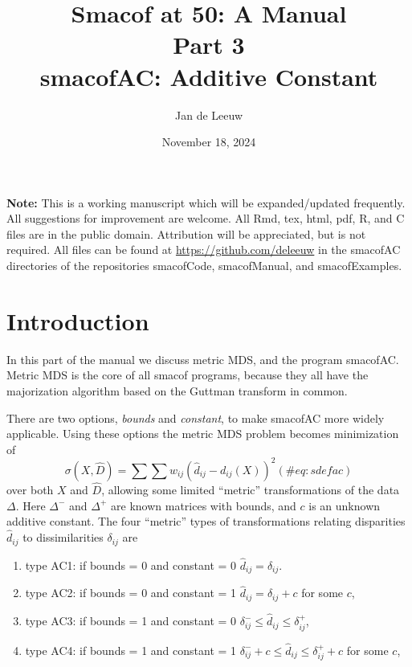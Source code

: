 \documentclass[
  12pt,
  letterpaper,
  DIV=11,
  numbers=noendperiod]{scrartcl}
\title{Smacof at 50: A Manual\\
Part 3\\
smacofAC: Additive Constant}
\author{Jan de Leeuw}
\date{November 18, 2024}
\providecommand{\tightlist}{%
  \setlength{\itemsep}{0pt}\setlength{\parskip}{0pt}}\usepackage{longtable,booktabs,array}
\renewcommand*\contentsname{Table of contents}
\newcommand\contentsname{Table of contents}
\begin{document}
\maketitle

\renewcommand*\contentsname{Table of contents}
{
\hypersetup{linkcolor=}
\setcounter{tocdepth}{3}
\tableofcontents
}

\textbf{Note:} This is a working manuscript which will be
expanded/updated frequently. All suggestions for improvement are
welcome. All Rmd, tex, html, pdf, R, and C files are in the public
domain. Attribution will be appreciated, but is not required. All files
can be found at \url{https://github.com/deleeuw} in the smacofAC
directories of the repositories smacofCode, smacofManual, and
smacofExamples.

\section{Introduction}\label{introduction}

In this part of the manual we discuss metric MDS, and the program
smacofAC. Metric MDS is the core of all smacof programs, because they
all have the majorization algorithm based on the Guttman transform in
common.

There are two options, \emph{bounds} and \emph{constant}, to make
smacofAC more widely applicable. Using these options the metric MDS
problem becomes minimization of \begin{equation}
\sigma(X,\hat D)=\sum\sum w_{ij}(\hat d_{ij}-d_{ij}(X))^2
(\#eq:sdefac)
\end{equation} over both \(X\) and \(\hat D\), allowing some limited
``metric'' transformations of the data \(\Delta\). Here \(\Delta^-\) and
\(\Delta^+\) are known matrices with bounds, and \(c\) is an unknown
additive constant. The four ``metric'' types of transformations relating
disparities \(\hat d_{ij}\) to dissimilarities \(\delta_{ij}\) are

\begin{enumerate}
\def\labelenumi{\arabic{enumi}.}
\tightlist
\item
  type AC1: if bounds = 0 and constant = 0 \(\hat d_{ij}=\delta_{ij}\).
\item
  type AC2: if bounds = 0 and constant = 1 \(\hat d_{ij}=\delta_{ij}+c\)
  for some \(c\),
\item
  type AC3: if bounds = 1 and constant = 0
  \(\delta^-_{ij}\leq\hat d_{ij}\leq\delta^+_{ij}\),
\item
  type AC4: if bounds = 1 and constant = 1
  \(\delta^-_{ij}+c\leq\hat d_{ij}\leq\delta^+_{ij}+c\) for some \(c\),
\end{enumerate}
\end{document}

